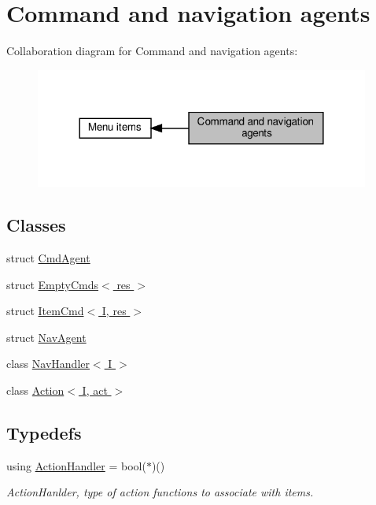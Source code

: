 \hypertarget{group__Agents}{}\section{Command and navigation agents}
\label{group__Agents}
Collaboration diagram for Command and navigation agents\+:\nopagebreak
\begin{figure}[H]
\begin{center}
\leavevmode
\includegraphics[width=312pt]{group__Agents}
\end{center}
\end{figure}
\subsection*{Classes}
\begin{DoxyCompactItemize}
\item 
struct \hyperlink{structCmdAgent}{Cmd\+Agent}
\item 
struct \hyperlink{structEmptyCmds}{Empty\+Cmds$<$ res $>$}
\item 
struct \hyperlink{structItemCmd}{Item\+Cmd$<$ I, res $>$}
\item 
struct \hyperlink{structNavAgent}{Nav\+Agent}
\item 
class \hyperlink{classNavHandler}{Nav\+Handler$<$ I $>$}
\item 
class \hyperlink{classAction}{Action$<$ I, act $>$}
\end{DoxyCompactItemize}
\subsection*{Typedefs}
\begin{DoxyCompactItemize}
\item 
\mbox{\label{group__Agents_gafbac13c24bfb11651f031fcd34ead566}} 
using \hyperlink{group__Agents_gafbac13c24bfb11651f031fcd34ead566}{Action\+Handler} = bool($\ast$)()
\begin{DoxyCompactList}\small\item\em Action\+Hanlder, type of action functions to associate with items. \end{DoxyCompactList}\end{DoxyCompactItemize}
